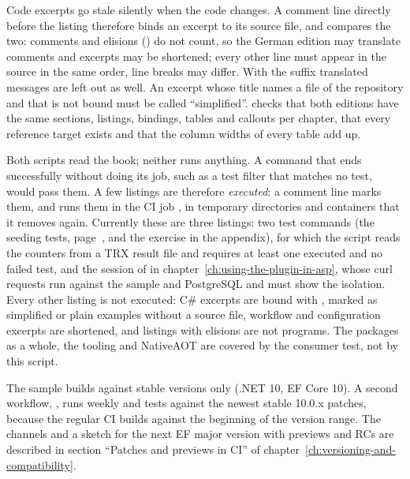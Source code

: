 Code excerpts go stale silently when the code changes. A comment line
 directly before the listing therefore binds an excerpt to its source
file, and  compares the two: comments and elisions
() do not count, so the German edition may translate comments and excerpts may be
shortened; every other line must appear in the source in the same order, line breaks may
differ. With the suffix  translated messages are left out as well. An excerpt
whose title names a file of the repository and that is not bound must be called “simplified”.
 checks that both editions have the same
sections, listings, bindings, tables and callouts per chapter, that every reference target exists
and that the column widths of every table add up.

Both scripts read the book; neither runs anything. A command that ends successfully without doing
its job, such as a test filter that matches no test, would pass them. A few listings are therefore
\emph{executed}: a comment line  marks them, and
 runs them in the CI job
, in temporary directories and containers that it removes
again. Currently these are three listings: two test commands (the seeding tests,
page~\pageref{sec:seeding-under-rls}, and the exercise in the appendix), for which the script reads the counters from a TRX result file and requires at least one executed and no
failed test, and the session of  in
chapter~\ref{ch:using-the-plugin-in-asp}, whose curl requests run against the sample and
PostgreSQL and must show the isolation. Every other listing is not executed: C\# excerpts are
bound with , marked as simplified or plain examples without a source file, workflow and configuration excerpts are
shortened, and listings with elisions are not programs. The packages as a whole, the
 tooling and NativeAOT are covered by the consumer test, not by this script.

The sample builds against stable versions only (.NET 10, EF Core 10). A second workflow,
, runs weekly and tests against the newest stable 10.0.x
patches, because the regular CI builds against the beginning of the version range. The
channels and a sketch for the next EF major version with previews and RCs are described in
section “Patches and previews in CI” of chapter~\ref{ch:versioning-and-compatibility}.


